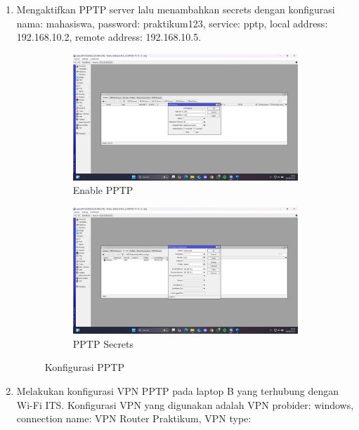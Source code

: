 \begin{enumerate}
\begin{figure}[H]
\begin{subfigure}[b]{0.4\linewidth}
			\caption{Aktifkan Proxy ARP\label{fig:konfigurasiR1}}
		\end{subfigure}
	\end{figure}
	\item Mengaktifkan PPTP server lalu menambahkan secrets dengan konfigurasi nama: mahasiswa, password: praktikum123, service: pptp, local address: 192.168.10.2, remote address: 192.168.10.5.
	\begin{figure}[H]
		\centering
		\begin{subfigure}[b]{0.4\linewidth}
			\centering
			\includegraphics[width=\linewidth]{P5/img/pptp enable.png}
			\caption{Enable PPTP\label{fig:konfigurasiR1}}
		\end{subfigure}
		\begin{subfigure}[b]{0.4\linewidth}
			\centering
			\includegraphics[width=\linewidth]{P5/img/pptp secrets.png}
			\caption{PPTP Secrets\label{fig:konfigurasiR2}}
		\end{subfigure}
		\caption{Konfigurasi PPTP}
		\hspace{1cm}
	\end{figure}
	\item Melakukan konfigurasi VPN PPTP pada laptop B yang terhubung dengan Wi-Fi ITS. Konfigurasi VPN yang digunakan adalah VPN probider: windows, connection name: VPN Router Praktikum, VPN type:

\end{enumerate}
